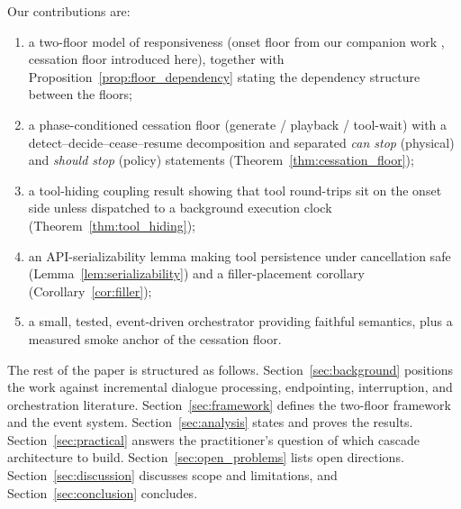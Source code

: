 Our contributions are:
\begin{enumerate}
  \item a two-floor model of responsiveness (onset floor from our companion work
        \citep{latencyfloor2025}, cessation floor introduced here), together with
        Proposition~\ref{prop:floor_dependency} stating the dependency structure between the
        floors;
  \item a phase-conditioned cessation floor (generate / playback / tool-wait) with a
        detect--decide--cease--resume decomposition and separated \emph{can stop}
        (physical) and \emph{should stop} (policy) statements
        (Theorem~\ref{thm:cessation_floor});
  \item a tool-hiding coupling result showing that tool round-trips sit on the onset side
        unless dispatched to a background execution clock (Theorem~\ref{thm:tool_hiding});
  \item an API-serializability lemma making tool persistence under cancellation safe
        (Lemma~\ref{lem:serializability}) and a filler-placement corollary
        (Corollary~\ref{cor:filler});
  \item a small, tested, event-driven orchestrator providing faithful semantics, plus a
        measured smoke anchor of the cessation floor.
\end{enumerate}

The rest of the paper is structured as follows.
Section~\ref{sec:background} positions the work against incremental dialogue processing,
endpointing, interruption, and orchestration literature.
Section~\ref{sec:framework} defines the two-floor framework and the event system.
Section~\ref{sec:analysis} states and proves the results.
Section~\ref{sec:practical} answers the practitioner's question of which cascade
architecture to build.
Section~\ref{sec:open_problems} lists open directions.
Section~\ref{sec:discussion} discusses scope and limitations, and
Section~\ref{sec:conclusion} concludes.
